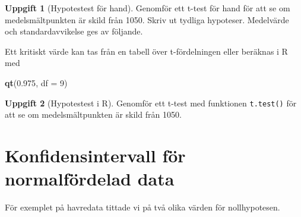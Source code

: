 \documentclass[
]{book}
\newenvironment{Shaded}{\begin{snugshade}}{\end{snugshade}}
\newcommand{\AttributeTok}[1]{\textcolor[rgb]{0.13,0.29,0.53}{#1}}
\newcommand{\DecValTok}[1]{\textcolor[rgb]{0.00,0.00,0.81}{#1}}
\newcommand{\FloatTok}[1]{\textcolor[rgb]{0.00,0.00,0.81}{#1}}
\newcommand{\FunctionTok}[1]{\textcolor[rgb]{0.13,0.29,0.53}{\textbf{#1}}}
\newcommand{\NormalTok}[1]{#1}
\newcommand{\SpecialCharTok}[1]{\textcolor[rgb]{0.81,0.36,0.00}{\textbf{#1}}}
\theoremstyle{definition}
\theoremstyle{definition}
\theoremstyle{definition}
\newtheorem{exercise}{Uppgift}[chapter]
\theoremstyle{definition}
\theoremstyle{remark}
\begin{document}
\begin{exercise}[Hypotestest för hand]

Genomför ett t-test för hand för att se om medelsmältpunkten är skild från 1050. Skriv ut tydliga hypoteser. Medelvärde och standardavvikelse ges av följande.

\begin{Shaded}
\end{Shaded}

Ett kritiskt värde kan tas från en tabell över t-fördelningen eller beräknas i R med

\begin{Shaded}
\begin{Highlighting}[]
\FunctionTok{qt}\NormalTok{(}\FloatTok{0.975}\NormalTok{, }\AttributeTok{df =} \DecValTok{9}\NormalTok{)}
\end{Highlighting}
\end{Shaded}

\end{exercise}

\begin{exercise}[Hypotestest i R]
Genomför ett t-test med funktionen \texttt{t.test()} för att se om medelsmältpunkten är skild från 1050.
\end{exercise}

\hypertarget{konfidensintervall-fuxf6r-normalfuxf6rdelad-data}{%
\section{Konfidensintervall för normalfördelad data}\label{konfidensintervall-fuxf6r-normalfuxf6rdelad-data}}

För exemplet på havredata tittade vi på två olika värden för nollhypotesen.

\begin{Shaded}
\end{Shaded}
\end{document}
